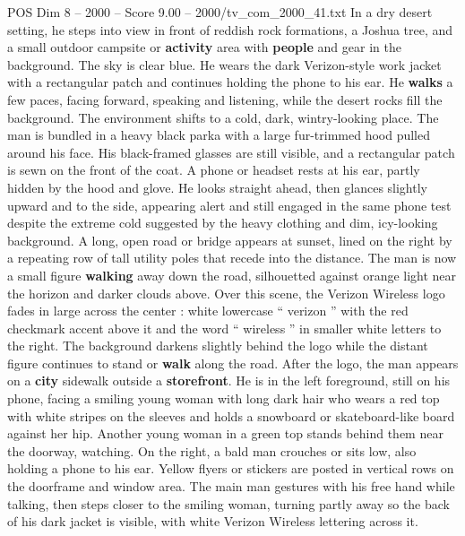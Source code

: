\begin{textsample}{POS Dim 8 – 2000 – Score 9.00 – 2000/tv\_com\_2000\_41.txt}
In a dry desert setting, he steps into view in front of reddish rock formations, a Joshua tree, and a small outdoor campsite or \textbf{activity} area with \textbf{people} and gear in the background.
The sky is clear blue.
He wears the dark Verizon-style work jacket with a rectangular patch and continues holding the phone to his ear.
He \textbf{walks} a few paces, facing forward, speaking and listening, while the desert rocks fill the background.
The environment shifts to a cold, dark, wintry-looking place.
The man is bundled in a heavy black parka with a large fur-trimmed hood pulled around his face.
His black-framed glasses are still visible, and a rectangular patch is sewn on the front of the coat.
A phone or headset rests at his ear, partly hidden by the hood and glove.
He looks straight ahead, then glances slightly upward and to the side, appearing alert and still engaged in the same phone test despite the extreme cold suggested by the heavy clothing and dim, icy-looking background.
A long, open road or bridge appears at sunset, lined on the right by a repeating row of tall utility poles that recede into the distance.
The man is now a small figure \textbf{walking} away down the road, silhouetted against orange light near the horizon and darker clouds above.
Over this scene, the Verizon Wireless logo fades in large across the center : white lowercase “ verizon ” with the red checkmark accent above it and the word “ wireless ” in smaller white letters to the right.
The background darkens slightly behind the logo while the distant figure continues to stand or \textbf{walk} along the road.
After the logo, the man appears on a \textbf{city} sidewalk outside a \textbf{storefront}.
He is in the left foreground, still on his phone, facing a smiling young woman with long dark hair who wears a red top with white stripes on the sleeves and holds a snowboard or skateboard-like board against her hip.
Another young woman in a green top stands behind them near the doorway, watching.
On the right, a bald man crouches or sits low, also holding a phone to his ear.
Yellow flyers or stickers are posted in vertical rows on the doorframe and window area.
The main man gestures with his free hand while talking, then steps closer to the smiling woman, turning partly away so the back of his dark jacket is visible, with white Verizon Wireless lettering across it.

\end{textsample}
